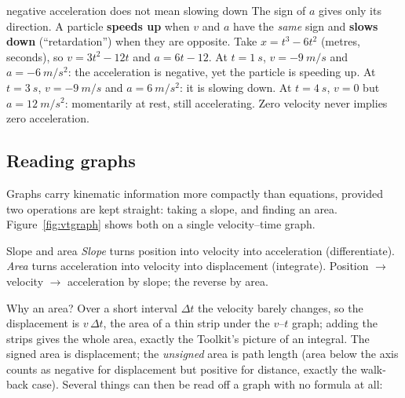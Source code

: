 \begin{trapbox}{negative acceleration does not mean slowing down}
The sign of $a$ gives only its direction. A particle \textbf{speeds up} when $v$ and $a$ have the
\emph{same} sign and \textbf{slows down} (``retardation'') when they are opposite. Take $x=t^{3}-6t^{2}$
(metres, seconds), so $v=3t^{2}-12t$ and $a=6t-12$. At $t=\SI{1}{s}$, $v=\SI{-9}{m/s}$ and
$a=\SI{-6}{m/s^2}$: the acceleration is negative, yet the particle is speeding up. At $t=\SI{3}{s}$,
$v=\SI{-9}{m/s}$ and $a=\SI{+6}{m/s^2}$: it is slowing down. At $t=\SI{4}{s}$, $v=0$ but
$a=\SI{12}{m/s^2}$: momentarily at rest, still accelerating. Zero velocity never implies zero
acceleration.
\end{trapbox}

\subsection{Reading graphs}

Graphs carry kinematic information more compactly than equations, provided two operations are kept straight:
taking a slope, and finding an area. Figure~\ref{fig:vtgraph} shows both on a single velocity--time graph.

\begin{figure}[htbp]
\centering
{}
\end{figure}

\begin{keybox}{Slope and area}
\emph{Slope} turns position into velocity into acceleration (differentiate).
\emph{Area} turns acceleration into velocity into displacement (integrate). Position $\to$ velocity
$\to$ acceleration by slope; the reverse by area.
\end{keybox}

Why an area? Over a short interval $\Delta t$ the velocity barely changes, so the displacement is
$v\,\Delta t$, the area of a thin strip under the $v$--$t$ graph; adding the strips gives the whole area,
exactly the Toolkit's picture of an integral. The signed area is displacement; the \emph{unsigned} area is path length (area below the axis counts as
negative for displacement but positive for distance, exactly the walk-back case). Several things can
then be read off a graph with no formula at all:

